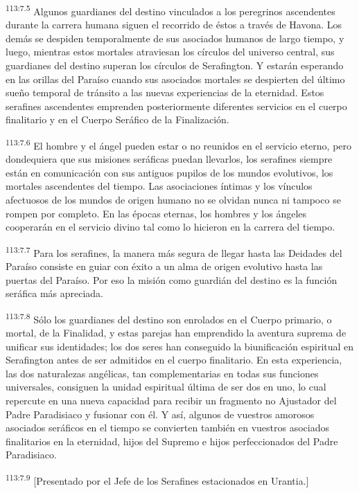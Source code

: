 \par
\textsuperscript{113:7.5} Algunos guardianes del destino vinculados a los peregrinos ascendentes durante la carrera humana siguen el recorrido de éstos a través de Havona. Los demás se despiden temporalmente de sus asociados humanos de largo tiempo, y luego, mientras estos mortales atraviesan los círculos del universo central, sus guardianes del destino superan los círculos de Serafington. Y estarán esperando en las orillas del Paraíso cuando sus asociados mortales se despierten del último sueño temporal de tránsito a las nuevas experiencias de la eternidad. Estos serafines ascendentes emprenden posteriormente diferentes servicios en el cuerpo finalitario y en el Cuerpo Seráfico de la Finalización.

\par
\textsuperscript{113:7.6} El hombre y el ángel pueden estar o no reunidos en el servicio eterno, pero dondequiera que sus misiones seráficas puedan llevarlos, los serafines siempre están en comunicación con sus antiguos pupilos de los mundos evolutivos, los mortales ascendentes del tiempo. Las asociaciones íntimas y los vínculos afectuosos de los mundos de origen humano no se olvidan nunca ni tampoco se rompen por completo. En las épocas eternas, los hombres y los ángeles cooperarán en el servicio divino tal como lo hicieron en la carrera del tiempo.

\par
\textsuperscript{113:7.7} Para los serafines, la manera más segura de llegar hasta las Deidades del Paraíso consiste en guiar con éxito a un alma de origen evolutivo hasta las puertas del Paraíso. Por eso la misión como guardián del destino es la función seráfica más apreciada.

\par
\textsuperscript{113:7.8} Sólo los guardianes del destino son enrolados en el Cuerpo primario, o mortal, de la Finalidad, y estas parejas han emprendido la aventura suprema de unificar sus identidades; los dos seres han conseguido la biunificación espiritual en Serafington antes de ser admitidos en el cuerpo finalitario. En esta experiencia, las dos naturalezas angélicas, tan complementarias en todas sus funciones universales, consiguen la unidad espiritual última de ser dos en uno, lo cual repercute en una nueva capacidad para recibir un fragmento no Ajustador del Padre Paradisiaco y fusionar con él. Y así, algunos de vuestros amorosos asociados seráficos en el tiempo se convierten también en vuestros asociados finalitarios en la eternidad, hijos del Supremo e hijos perfeccionados del Padre Paradisiaco.

\par
\textsuperscript{113:7.9} [Presentado por el Jefe de los Serafines estacionados en Urantia.]
